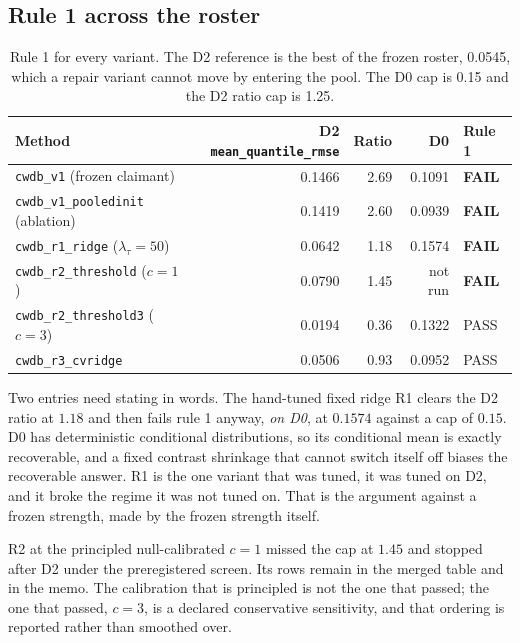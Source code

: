 \documentclass[11pt,a4paper]{article}
\theoremstyle{definition}
\theoremstyle{remark}
\begin{document}
\subsection{Rule 1 across the roster}

\begin{table}[htbp]
\centering
\caption{Rule 1 for every variant. The D2 reference is the best of the frozen
roster, 0.0545, which a repair variant cannot move by entering the pool. The D0
cap is 0.15 and the D2 ratio cap is 1.25.}
\label{tab:rule1}
\small
\begin{tabular}{@{}lrrrl@{}}
\toprule
Method & D2 \texttt{mean\_quantile\_rmse} & Ratio & D0 & Rule 1 \\
\midrule
\texttt{cwdb\_v1} (frozen claimant) & 0.1466 & 2.69 & 0.1091 & \textbf{FAIL} \\
\texttt{cwdb\_v1\_pooledinit} (ablation) & 0.1419 & 2.60 & 0.0939 & \textbf{FAIL} \\
\texttt{cwdb\_r1\_ridge} ($\lambda_\tau = 50$) & 0.0642 & 1.18 & 0.1574 & \textbf{FAIL} \\
\texttt{cwdb\_r2\_threshold} ($c=1$) & 0.0790 & 1.45 & not run & \textbf{FAIL} \\
\texttt{cwdb\_r2\_threshold3} ($c=3$) & 0.0194 & 0.36 & 0.1322 & PASS \\
\texttt{cwdb\_r3\_cvridge} & 0.0506 & 0.93 & 0.0952 & PASS \\
\bottomrule
\end{tabular}
\end{table}

Two entries need stating in words. The hand-tuned fixed ridge R1 clears the D2
ratio at $1.18$ and then fails rule 1 anyway, \emph{on D0}, at $0.1574$ against a
cap of $0.15$. D0 has deterministic conditional distributions, so its conditional
mean is exactly recoverable, and a fixed contrast shrinkage that cannot switch
itself off biases the recoverable answer. R1 is the one variant that was tuned,
it was tuned on D2, and it broke the regime it was not tuned on. That is the
argument against a frozen strength, made by the frozen strength itself.

R2 at the principled null-calibrated $c = 1$ missed the cap at $1.45$ and stopped
after D2 under the preregistered screen. Its rows remain in the merged table and
in the memo. The calibration that is principled is not the one that passed; the
one that passed, $c = 3$, is a declared conservative sensitivity, and that
ordering is reported rather than smoothed over.
\end{document}
